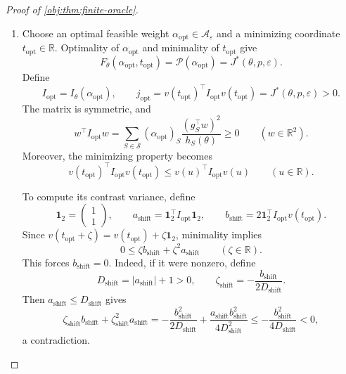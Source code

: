 \begin{proof}[Proof of \cref{obj:thm:finite-oracle}]
\begin{enumerate}
Define the vector
\[
y_Q=\ell_Qv(t_Q)-w_Q\in\mathbb R^2.
\]
Using \(v(t_Q)^\top c=1\), expansion yields
\[
0\le y_Q^\top I_\theta(Q)y_Q
=
\ell_Q\left(
\ell_Qv(t_Q)^\top I_\theta(Q)v(t_Q)-1
\right).
\]
Since \(\ell_Q>0\), the intermediate bound above implies
\[
1
\le
\ell_Qv(t_Q)^\top I_\theta(Q)v(t_Q)
\le
\ell_QJ^*(\theta,p,\varepsilon).
\]
Taking the reciprocal of the positive optimized information gives
\[
V^*(\theta,p,\varepsilon)
=\frac{1}{J^*(\theta,p,\varepsilon)}
\le\ell_Q
=c^\top I_\theta(Q)^+c.
\]

\item Choose an optimal feasible weight
\(\alpha_{\mathrm{opt}}\in\mathcal A_\varepsilon\) and a minimizing
coordinate \(t_{\mathrm{opt}}\in\mathbb R\). Optimality of \(\alpha_{\mathrm{opt}}\) and minimality of
\(t_{\mathrm{opt}}\) give
\[
F_\theta(\alpha_{\mathrm{opt}},t_{\mathrm{opt}})
=
\mathscr P(\alpha_{\mathrm{opt}})
=
J^*(\theta,p,\varepsilon).
\]
Define
\[
I_{\mathrm{opt}}=I_\theta(\alpha_{\mathrm{opt}}),
\qquad
j_{\mathrm{opt}}
=
v(t_{\mathrm{opt}})^\top I_{\mathrm{opt}}v(t_{\mathrm{opt}})
=
J^*(\theta,p,\varepsilon)>0.
\]
The matrix is symmetric, and
\[
w^\top I_{\mathrm{opt}}w
=
\sum_{S\in\mathcal S}
(\alpha_{\mathrm{opt}})_S
\frac{(g_S^\top w)^2}{h_S(\theta)}
\ge0
\qquad(w\in\mathbb R^2).
\]
Moreover, the minimizing property becomes
\[
v(t_{\mathrm{opt}})^\top I_{\mathrm{opt}}v(t_{\mathrm{opt}})
\le
v(u)^\top I_{\mathrm{opt}}v(u)
\qquad(u\in\mathbb R).
\]

To compute its contrast variance, define
\[
\mathbf 1_2=\begin{pmatrix}1\\1\end{pmatrix},
\qquad
a_{\mathrm{shift}}=\mathbf 1_2^\top I_{\mathrm{opt}}\mathbf 1_2,
\qquad
b_{\mathrm{shift}}
=2\mathbf 1_2^\top I_{\mathrm{opt}}v(t_{\mathrm{opt}}).
\]
Since \(v(t_{\mathrm{opt}}+\zeta)
=v(t_{\mathrm{opt}})+\zeta\mathbf 1_2\), minimality implies
\[
0\le
\zeta b_{\mathrm{shift}}+\zeta^2a_{\mathrm{shift}}
\qquad(\zeta\in\mathbb R).
\]
This forces \(b_{\mathrm{shift}}=0\). Indeed, if it were nonzero,
define
\[
D_{\mathrm{shift}}=|a_{\mathrm{shift}}|+1>0,
\qquad
\zeta_{\mathrm{shift}}
=-\frac{b_{\mathrm{shift}}}{2D_{\mathrm{shift}}}.
\]
Then \(a_{\mathrm{shift}}\le D_{\mathrm{shift}}\) gives
\[
\zeta_{\mathrm{shift}}b_{\mathrm{shift}}
+\zeta_{\mathrm{shift}}^2a_{\mathrm{shift}}
=
-\frac{b_{\mathrm{shift}}^2}{2D_{\mathrm{shift}}}
+\frac{a_{\mathrm{shift}}b_{\mathrm{shift}}^2}
{4D_{\mathrm{shift}}^2}
\le
-\frac{b_{\mathrm{shift}}^2}{4D_{\mathrm{shift}}}<0,
\]
a contradiction.


\end{enumerate}
\end{proof}
